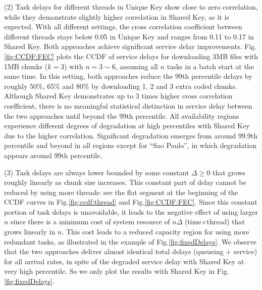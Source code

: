 \documentclass[journal]{IEEEtran}
\begin{document}
(2)
\label{obs:weakCorrelation}
Task delays for different threads in Unique Key show close to zero correlation, while they demonstrate slightly higher correlation in Shared Key, as it is  expected.
With all different settings, the cross correlation coefficient between different threads stays below 0.05 in Unique Key and ranges from 0.11 to 0.17 in Shared Key. 
Both approaches achieve significant service delay improvements. 
Fig.\ref{fig:CCDF:FEC} plots the CCDF of service delays for downloading 3MB files with 1MB chunks ($k=3$) with $n= 3 \sim 6$, assuming all $n$ tasks in a batch start at the same time. In this setting, both approaches reduce the 99th percentile delays by roughly 50\%, 65\% and 80\% by downloading 1, 2 and 3 extra coded chunks. Although Shared Key demonstrates up to 3 times higher cross correlation coefficient, there is no meaningful statistical distinction in service delay between the two approaches until beyond the 99th percentile.
All availability regions experience different degrees of degradation at high percentiles with Shared Key due to the higher correlation. 
Significant degradation emerges from around 99.9th percentile and beyond in all regions except for ``Sao Paulo'', in which degradation appears around 99th percentile.



(3)
\label{obs:lowerBound} 
Task delays are always lower bounded by some constant $\Delta\ge 0$ that grows roughly linearly as chunk size increases. This constant part of delay cannot be reduced by using more threads: see the flat segment at the beginning of the CCDF curves in Fig.\ref{fig:ccdf:thread} and Fig.\ref{fig:CCDF:FEC}. Since this constant portion of task delays is unavoidable, it leads to the negative effect of using larger $n$ since there is a minimum cost of system resource of $n\Delta $ (time$\times$thread) that grows linearly in $n$. This cost leads to a reduced capacity region for using more redundant tasks, as illustrated in the example of Fig.\ref{fig:fixedDelays}. 
We observe that the two approaches deliver almost identical total delays (queueing + service) for all arrival rates, in spite of the degraded service delay with Shared Key at very high percentile. So we only plot the results with Shared Key in Fig.\ref{fig:fixedDelays}.
\end{document}
